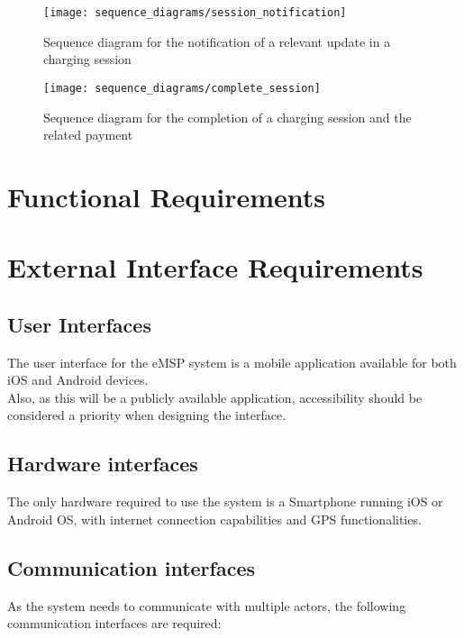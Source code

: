 \begin{figure}[h]
\centering
\texttt{[image: sequence\_diagrams/session\_notification]}
\caption{Sequence diagram for the notification of a relevant update in a charging session}
\end{figure}


\begin{figure}[h]
\centering
\texttt{[image: sequence\_diagrams/complete\_session]}
\caption{Sequence diagram for the completion of a charging session and the related payment}
\end{figure}

\clearpage
\newpage


\section{Functional Requirements}

\section{External Interface Requirements}
\subsection{User Interfaces}
The user interface for the eMSP system is a mobile application available for both iOS and Android devices.\\
Also, as this will be a publicly available application, accessibility should be considered a priority when designing the interface.

\subsection{Hardware interfaces}
The only hardware required to use the system is a Smartphone running iOS or Android OS, with internet connection capabilities and GPS functionalities.

\subsection{Communication interfaces}
As the system needs to communicate with multiple actors, the following communication interfaces are required:


